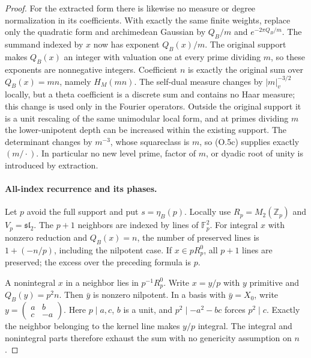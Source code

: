 \begin{proof}
For the extracted form there is likewise no measure or degree
normalization in its coefficients. With exactly the same finite
weights, replace only the quadratic form and archimedean Gaussian
by $Q_B/m$ and $e^{-2\pi Q_B/m}$. The summand indexed by $x$ now
has exponent $Q_B(x)/m$. The original support makes $Q_B(x)$ an
integer with valuation one at every prime dividing $m$, so these
exponents are nonnegative integers. Coefficient $n$ is exactly
the original sum over $Q_B(x)=mn$, namely $H_M(mn)$.
The self-dual measure changes by $|m|_v^{-3/2}$ locally, but a
theta coefficient is a discrete sum and contains no Haar
measure; this change is used only in the Fourier operators.
Outside the original support it is a unit rescaling of the same
unimodular local form, and at primes dividing $m$ the
lower-unipotent depth can be increased within the existing
support. The determinant changes by $m^{-3}$, whose squareclass
is $m$, so (O.5c) supplies exactly $(m/\cdot)$.
In particular no new level prime, factor of $m$, or dyadic
root of unity is introduced by extraction.


\paragraph{All-index recurrence and its phases.}
Let $p$ avoid the full support and put $s=\eta_B(p)$.
Locally use $R_p=M_2(\mathbb Z_p)$ and $V_p=\mathfrak{sl}_2$.
The $p+1$ neighbors are indexed by lines of $\mathbb F_p^2$.
For integral $x$ with nonzero reduction and $Q_B(x)=n$, the number
of preserved lines is $1+(-n/p)$, including the nilpotent case.
If $x\in pR_p^0$, all $p+1$ lines are preserved; the excess
over the preceding formula is $p$.

A nonintegral $x$ in a neighbor lies in $p^{-1}R_p^0$.
Write $x=y/p$ with $y$ primitive and $Q_B(y)=p^2n$.
Then $\bar y$ is nonzero nilpotent.  In a basis with
$\bar y=X_0$, write
$y=\left(\begin{smallmatrix}a&b\\c&-a\end{smallmatrix}\right)$.
Here $p\mid a,c$, $b$ is a unit, and
$p^2\mid-a^2-bc$ forces $p^2\mid c$.  Exactly the neighbor
belonging to the kernel line makes $y/p$ integral.  The integral
and nonintegral parts therefore exhaust the sum with no genericity
assumption on $n$.


\end{proof}
